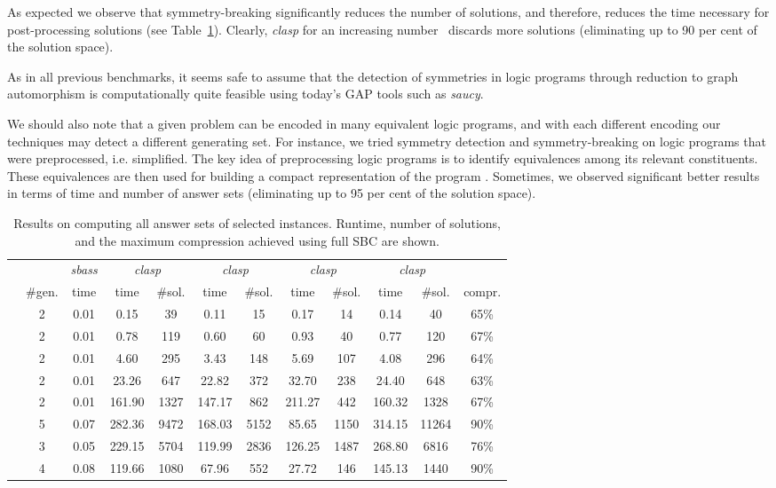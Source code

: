 \documentclass[envcountsame]{llncs}
\newcommand{\systemname}[1]{\emph{#1}}
\begin{document}
As expected we observe that symmetry-breaking significantly reduces the number of solutions, and therefore, reduces the time necessary for post-processing solutions (see Table~\ref{tab:models}). Clearly, \systemname{clasp} for an increasing number~ discards more solutions (eliminating up to 90 per cent of the solution space).

As in all previous benchmarks, it seems safe to assume that the detection of symmetries in logic programs through reduction to graph automorphism is computationally quite feasible using today's GAP tools such as \systemname{saucy}.

We should also note that a given problem can be encoded in many equivalent logic programs, and with each different encoding our techniques may detect a different generating set. For instance, we tried symmetry detection and symmetry-breaking on logic programs that were preprocessed, i.e. simplified. The key idea of preprocessing logic programs is to identify equivalences among its relevant constituents. These equivalences are then used for building a compact representation of the program \cite{gekanesc08a}. Sometimes, we observed significant better results in terms of time and number of answer sets (eliminating up to 95 per cent of the solution space).
\begin{table}
\caption{Results on computing all answer sets of selected instances. Runtime, number of solutions, and the maximum compression achieved using full SBC are shown.\label{tab:models}}
\centering
\begin{tabular}{lccccccccccc}
\hline\noalign{\smallskip}
 & & \systemname{sbass} & \multicolumn{2}{c}{\systemname{clasp}} & \multicolumn{2}{c}{\systemname{clasp}} & \multicolumn{2}{c}{\systemname{clasp}} & \multicolumn{2}{c}{\systemname{clasp}} & \\
  & \#gen. & time & time & \#sol. & time & \#sol. & time & \#sol. & time & \#sol. & compr.\\
\noalign{\smallskip}
\hline
\noalign{\smallskip}
  & 2 & 0.01 &   0.15 & 39   &   0.11 & 15   &   0.17 & 14   &   0.14 & 40    &65\%\\
  & 2 & 0.01 &   0.78 & 119  &   0.60 & 60   &   0.93 & 40   &   0.77 & 120   &67\%\\
 & 2 & 0.01 &   4.60 & 295  &   3.43 & 148  &   5.69 & 107  &   4.08 & 296   &64\%\\
 & 2 & 0.01 &  23.26 & 647  &  22.82 & 372  &  32.70 & 238  &  24.40 & 648   &63\%\\
 & 2 & 0.01 & 161.90 & 1327 & 147.17 & 862  & 211.27 & 442  & 160.32 & 1328  &67\%\\
        & 5 & 0.07 & 282.36 & 9472 & 168.03 & 5152 &  85.65 & 1150 & 314.15 & 11264 &90\%\\
      & 3 & 0.05 & 229.15 & 5704 & 119.99 & 2836 & 126.25 & 1487 & 268.80 & 6816  &76\%\\
      & 4 & 0.08 & 119.66 & 1080 &  67.96 & 552  &  27.72 & 146  & 145.13 & 1440  &90\%\\
\hline
\end{tabular}
\end{table}
\end{document}
